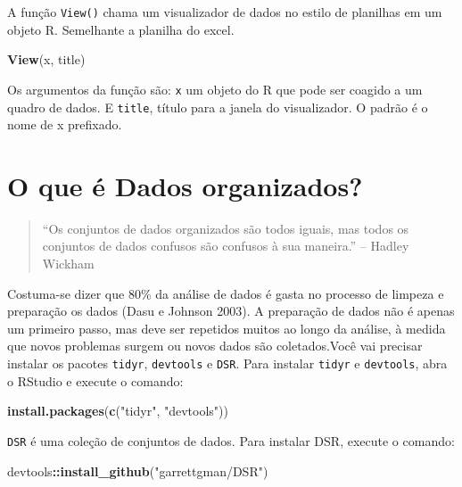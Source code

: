 \documentclass[]{book}
\newenvironment{Shaded}{\begin{snugshade}}{\end{snugshade}}
\newcommand{\KeywordTok}[1]{\textcolor[rgb]{0.13,0.29,0.53}{\textbf{#1}}}
\newcommand{\NormalTok}[1]{#1}
\newcommand{\OperatorTok}[1]{\textcolor[rgb]{0.81,0.36,0.00}{\textbf{#1}}}
\newcommand{\StringTok}[1]{\textcolor[rgb]{0.31,0.60,0.02}{#1}}
\begin{document}
A função \texttt{View()} chama um visualizador de dados no estilo de planilhas em um objeto R. Semelhante a planilha do excel.

\begin{Shaded}
\begin{Highlighting}[]
\KeywordTok{View}\NormalTok{(x, title)}
\end{Highlighting}
\end{Shaded}

Os argumentos da função são: \texttt{x} um objeto do R que pode ser coagido a um quadro de dados. E \texttt{title}, título para a janela do visualizador. O padrão é o nome de x prefixado.

\hypertarget{o-que-e-dados-organizados}{%
\section{O que é Dados organizados?}\label{o-que-e-dados-organizados}}

\begin{quote}
``Os conjuntos de dados organizados são todos iguais, mas todos os conjuntos de dados confusos são confusos à sua maneira.'' -- Hadley Wickham
\end{quote}

Costuma-se dizer que 80\% da análise de dados é gasta no processo de limpeza e preparação os dados (Dasu e Johnson 2003). A preparação de dados não é apenas um primeiro passo, mas deve ser repetidos muitos ao longo da análise, à medida que novos problemas surgem ou novos dados são coletados.Você vai precisar instalar os pacotes \texttt{tidyr}, \texttt{devtools} e \texttt{DSR}. Para instalar \texttt{tidyr} e \texttt{devtools}, abra o RStudio e execute o comando:

\begin{Shaded}
\begin{Highlighting}[]
\KeywordTok{install.packages}\NormalTok{(}\KeywordTok{c}\NormalTok{(}\StringTok{"tidyr"}\NormalTok{, }\StringTok{"devtools"}\NormalTok{))}
\end{Highlighting}
\end{Shaded}

\texttt{DSR} é uma coleção de conjuntos de dados. Para instalar DSR, execute o comando:

\begin{Shaded}
\begin{Highlighting}[]
\NormalTok{devtools}\OperatorTok{::}\KeywordTok{install_github}\NormalTok{(}\StringTok{"garrettgman/DSR"}\NormalTok{)}
\end{Highlighting}
\end{Shaded}
\end{document}
